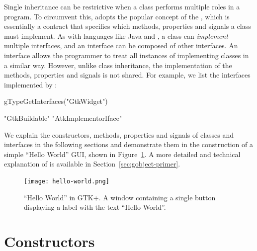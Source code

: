 Single inheritance can be restrictive when a class performs multiple
roles in a program. To circumvent this,  adopts the popular
concept of the , which is essentially a contract
that specifies which methods, properties and signals a class must
implement. As with languages like Java and , a class can
\textit{implement} multiple interfaces, and an interface can be
composed of other interfaces. An interface allows the programmer to
treat all instances of implementing classes in a similar way. However,
unlike class inheritance, the implementation of the methods,
properties and signals is not shared. For example, we list the
interfaces implemented by :
\begin{Schunk}
\begin{Sinput}
 gTypeGetInterfaces("GtkWidget")
\end{Sinput}
\begin{Soutput}
[1] "GtkBuildable"        "AtkImplementorIface"
\end{Soutput}
\end{Schunk}

We explain the constructors, methods, properties and signals of
classes and interfaces in the following sections and demonstrate them
in the construction of a simple ``Hello World'' GUI, shown in
Figure~\ref{fig:hello-world}. A more detailed and technical
explanation of  is available in
Section~\ref{sec:gobject-primer}.

\begin{figure}[h!tbp]
  \begin{center}
    \texttt{[image: hello-world.png]}
    \caption{\label{fig:hello-world}``Hello World'' in GTK+. 
      A window containing a single button displaying a label with the text
      ``Hello World''.}
  \end{center}
\end{figure}

\section{Constructors}

